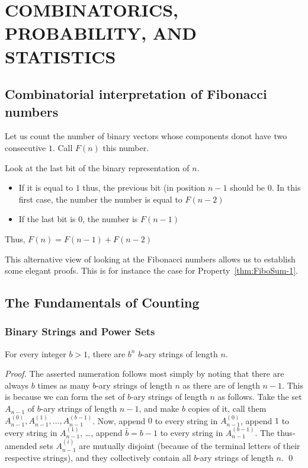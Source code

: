 
\chapter{COMBINATORICS, PROBABILITY, AND STATISTICS}
\label{ch:combinatorics}

\section{Combinatorial interpretation of Fibonacci numbers}

Let us count the number of binary vectors whose components donot have two
consecutive $1$. Call $F(n)$ this number.

Look at the last bit of the binary representation of $n$.

\begin{itemize}
\item
If it is equal to $1$ thus, the previous bit (in position $n-1$ should be $0$.
In this first case, the number the number is equal to $F(n-2)$
\item
If the last bit is $0$, the number is $F(n-1)$
\end{itemize}
Thus, $F(n) = F(n-1) + F(n-2)$
\bigskip

This alternative view of looking at the Fibonacci numbers allows us to establish some elegant proofs.
This is for instance the case for Property~\ref{thm:FiboSum-1}. 



\section{The Fundamentals of Counting}
\label{sec:counting}


\subsection{Binary Strings and Power Sets}

\begin{prop}
\label{thm:b-ary strings}
For every integer $b > 1$, there are $b^n$ $b$-ary strings of length
$n$.
\end{prop}

\begin{proof}
The asserted numeration follows most simply by noting that there are
always $b$ times as many $b$-ary strings of length $n$ as there are of
length $n-1$.  This is because we can form the set of $b$-ary strings
of length $n$ as follows.  Take the set $A_{n-1}$ of $b$-ary strings
of length $n-1$, and make $b$ copies of it, call them $A^{(0)}_{n-1},
A^{(1)}_{n-1}, \ldots, A^{(b-1)}_{n-1}$.  Now, append $0$ to every
string in $A^{(0)}_{n-1}$, append $1$ to every string in
$A^{(1)}_{n-1}$, \ldots, append $\bar{b} = b-1$ to every string in
$A^{(b-1)}_{n-1}$.  The thus-amended sets $A^{(i)}_{n-1}$ are mutually
disjoint (because of the terminal letters of their respective
strings), and they collectively contain all $b$-ary strings of length
$n$.  \qed
\end{proof}

